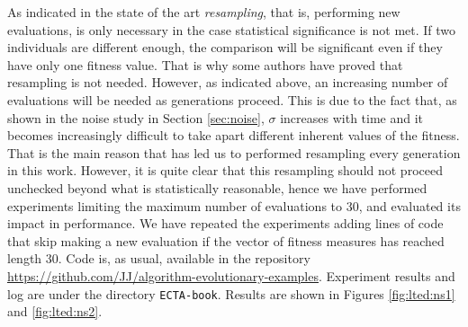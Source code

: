 \documentclass{svmult}
\begin{document}
As indicated in the state of the art {\em resampling}, that is,
performing new evaluations, is only necessary in the case statistical
significance is not met. If two individuals are different enough, the
comparison will be significant even if they have only one
fitness value. 
That is why some authors \cite{Qian:sampling} have proved that
resampling is not needed.
However, as indicated above, an increasing number of evaluations will be needed as generations proceed.
 This is due to the fact that, as shown in the noise study in Section
 \ref{sec:noise}, $\sigma$ increases with time and it becomes
 increasingly difficult to take apart different inherent values of the
 fitness.
That is the main reason that has led us to performed resampling every
generation in this work. However, it is
quite clear that this resampling should not proceed unchecked beyond
what is statistically reasonable, hence we have performed
experiments limiting the maximum number of evaluations to 30, and
evaluated its impact in performance. We have repeated the experiments
adding lines of code that skip making a new evaluation if the vector
of fitness measures has reached length 30.
Code is, as usual, available in
the repository
\url{https://github.com/JJ/algorithm-evolutionary-examples}. Experiment
results and log are under the directory {\tt ECTA-book}. Results are
shown in Figures \ref{fig:lted:ns1} and \ref{fig:lted:ns2}. 
\end{document}
